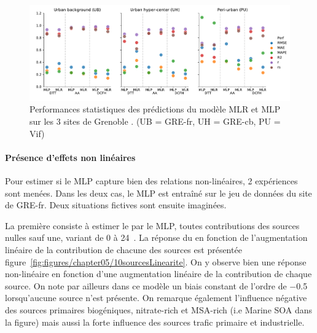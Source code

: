 \begin{figure}[ht]
    \centering
    \includegraphics[width=1.0\linewidth]{figures/chapter05/perfMLPMLR.pdf}
    \caption{Performances statistiques des prédictions du modèle MLR et MLP sur les 3
    sites de Grenoble \autocite{borlazaUrbaninprep.}. (UB = GRE-fr, UH = GRE-cb, PU = Vif)}%
    \label{fig:perfMLPMLR}
\end{figure}


\paragraph{Présence d'effets non linéaires}%
\label{par:présence_d_effets_non_linéaires}

Pour estimer si le MLP capture bien des relations non-linéaires, 2 expériences sont menées.
Dans les deux cas, le MLP est entraîné sur le jeu de données du site de GRE-fr. Deux
situations fictives sont ensuite imaginées.

La première consiste à estimer le \PODTTv{} par le MLP, toutes contributions des sources
nulles sauf une, variant de 0 à 24~\si{\ugm}. La réponse du \PODTTv{} en fonction de
l'augmentation linéaire de la contribution de chacune des sources est présentée
figure~\ref{fig:figures/chapter05/10sourcesLinearite}. On y observe bien une réponse
non-linéaire en fonction d'une augmentation linéaire de la contribution de
chaque source. On note par ailleurs dans ce modèle un biais constant de l'ordre de
\SI{-0.5}{\opv} lorsqu'aucune source n'est présente.
On remarque également l'influence négative des sources primaires biogéniques, nitrate-rich
et MSA-rich (i.e Marine SOA dans la figure) mais aussi la forte influence des sources
trafic primaire et industrielle.

